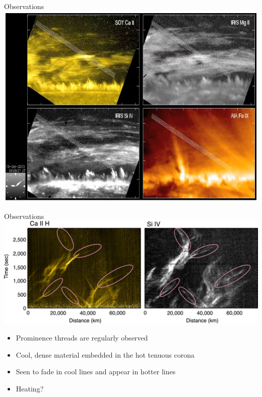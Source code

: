 \documentclass[10pt,aspectratio=169,usenames,dvipsnames]{beamer}
\begin{document}
\begin{frame}{Observations}
\centering
\includegraphics[width=0.75\linewidth]{2023Dundee/Figures/prominence.png}
\end{frame}

\begin{frame}{Observations}
\centering
\includegraphics[width=0.95\linewidth]{2023Dundee/Figures/observation.png}
\begin{itemize}
    \item Prominence threads are regularly observed
    \item Cool, dense material embedded in the hot tenuous corona
    \item Seen to fade in cool lines and appear in hotter lines
    \item Heating?
\end{itemize}
\end{frame}
\end{document}

